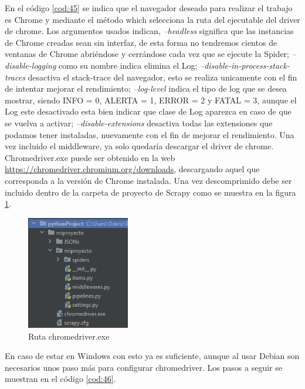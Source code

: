 En el código \ref{cod:45} se indica que el navegador deseado para realizar el trabajo es Chrome y mediante el método which selecciona la ruta del ejecutable del driver de chrome. Los argumentos usados indican, \textit{--headless} significa que las instancias de Chrome creadas sean sin interfaz, de esta forma no tendremos cientos de ventanas de Chrome abriéndose y cerrándose cada vez que se ejecute la Spider; \textit{--disable-logging} como su nombre indica elimina el Log; \textit{--disable-in-process-stack-traces} desactiva el stack-trace del navegador, esto se realiza unicamente con el fin de intentar mejorar el rendimiento; \textit{--log-level} indica el tipo de log que se desea mostrar, siendo INFO = 0, ALERTA = 1, ERROR = 2 y FATAL = 3, aunque el Log este desactivado esta bien indicar que clase de Log aparezca en caso de que se vuelva a activar; \textit{--disable-extensions} desactiva todas las extensiones que podamos tener instaladas, nuevamente con el fin de mejorar el rendimiento.\newline
\newline
Una vez incluido el middleware, ya solo quedaría descargar el driver de chrome. Chromedriver.exe puede ser obtenido en la web \url{https://chromedriver.chromium.org/downloads}, descargando aquel que corresponda a la versión de Chrome instalada. Una vez descomprimido debe ser incluido dentro de la carpeta de proyecto de Scrapy como se muestra en la figura \ref{fig:ej15}.

\begin{figure} [h!]
	\centering
	\includegraphics[width=0.4\textwidth]{fig/chromedriver.png}
	\caption[Ruta chromedriver.exe]{Ruta chromedriver.exe}
	\label{fig:ej15}
\end{figure}

En caso de estar en Windows con esto ya es suficiente, aunque al usar Debian son necesarios unos paso más para configurar chromedriver. Los pasos a seguir se muestran en el código \ref{cod:46}.

